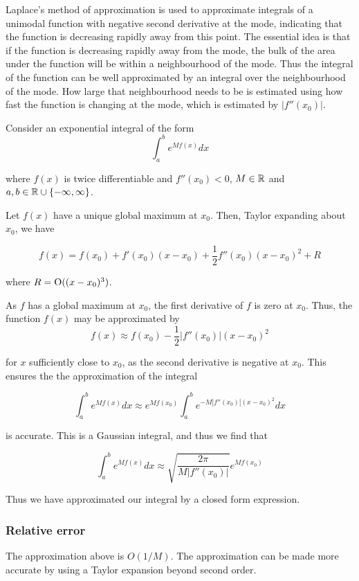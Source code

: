 Laplace's method of approximation is used to approximate integrals of a unimodal function with negative second
derivative at the mode, indicating that the function is decreasing rapidly away from this point. The essential
idea is that if the function is decreasing rapidly away from the mode, the bulk of the area under the function
will be within a neighbourhood of the mode. Thus the integral of the function can be well approximated by an
integral over the neighbourhood of the mode. How large that neighbourhood needs to be is estimated using
how fast the function is changing at the mode, which is estimated by $|f''(x_0)|$.

Consider an exponential integral of the form
\[
	\int_a^b e^{M f(x)} dx
\]

where $f(x)$ is twice differentiable and $f''(x_0) < 0$, $M \in {\mathbb{R}}$ and $a, b \in {\mathbb{R}} \cup \{-\infty, \infty\}$.

Let $f(x)$ have a unique global maximum at $x_0$. Then, Taylor expanding about $x_0$, we have

\[
	f(x) = f(x_0) + f'(x_0) (x - x_0) + \frac{1}{2} f''(x_0) (x - x_0)^2 + R
\]

where $R = \text{O}((x - x_0)^3)$.

As $f$ has a global maximum at $x_0$, the first derivative of $f$ is zero at $x_0$. Thus, the function $f(x)$
may be approximated by
\[
	f(x) \approx f(x_0) - \frac{1}{2} |f''(x_0)| (x - x_0)^2
\]

for $x$ sufficiently close to $x_0$, as the second derivative is negative at $x_0$. This ensures the
the approximation of the integral

\[
	\int_a^b e^{M f(x)} dx \approx e^{M f(x_0)} \int_a^b e^{-M |f''(x_0)|(x - x_0)^2} dx
\]

is accurate. This is a Gaussian integral, and thus we find that

\[
	\int_a^b e^{M f(x)} dx \approx \sqrt{\frac{2 \pi}{M |f''(x_0)|}} e^{M f(x_0)}
\]

Thus we have approximated our integral by a closed form expression.

\subsubsection{Relative error} %
The approximation above is $O(1/M)$. %
The approximation can be made more accurate by using a Taylor
expansion beyond second order.

